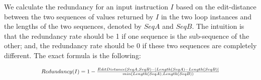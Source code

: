 {\color{red}
We calculate the redundancy for an input instruction $I$ based on the
edit-distance between the two sequences of values returned by $I$ in the two
loop instances
and the lengths of the two sequences, denoted by $SeqA$ and $SeqB$. 
The intuition is that the redundancy rate should be 1 if one sequence is the 
sub-sequence of the other; and, the redundancy rate should be 0 if these two
sequences are completely different.
}
The exact formula is the following:

\vspace{-0.1in}
\[
\Scale[0.8]{
	Redundancy(I) = 1 - \frac{EditDistance(SeqA, SeqB) - |Length(SeqA) - Length(SeqB)|}{min(Length(SeqA), Length(SeqB))}
}
\]






